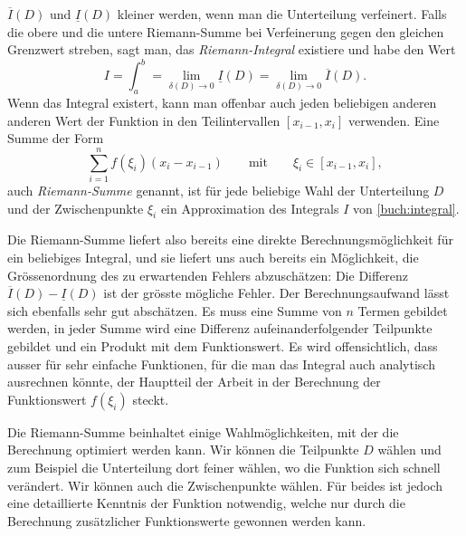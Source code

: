 $\overline{I}(D)$ und $\underline{I}(D)$ kleiner werden, wenn man die 
Unterteilung verfeinert.
Falls die obere und die untere Riemann-Summe bei Verfeinerung gegen
den gleichen Grenzwert streben, sagt man, das {\em Riemann-Integral}
%
existiere und habe den Wert
\[
I
=
\int_a^b
=
\lim_{\delta(D)\to 0} \underline{I}(D)
=
\lim_{\delta(D)\to 0} \overline{I}(D).
\]
Wenn das Integral existert, kann man offenbar auch jeden beliebigen
anderen anderen Wert der Funktion in den Teilintervallen $[x_{i-1},x_i]$
verwenden.
Eine Summe der Form
\[
\sum_{i=1}^n f(\xi_i) (x_{i}-x_{i-1})
\qquad\text{mit}\qquad \xi_i \in [x_{i-1},x_i],
\]
auch {\em Riemann-Summe} genannt,
ist für jede beliebige Wahl der Unterteilung $D$ und der Zwischenpunkte
$\xi_i$ ein Approximation des Integrals $I$ von \eqref{buch:integral}.

Die Riemann-Summe liefert also bereits eine direkte Berechnungsmöglichkeit
für ein beliebiges Integral, und sie liefert uns auch bereits ein Möglichkeit,
die Grössenordnung des zu erwartenden Fehlers abzuschätzen:
Die Differenz $\overline{I}(D)-\underline{I}(D)$ ist der grösste mögliche
Fehler.
Der Berechnungsaufwand lässt sich ebenfalls sehr gut abschätzen.
Es muss eine Summe von $n$ Termen gebildet werden, in jeder Summe
wird eine Differenz aufeinanderfolgender Teilpunkte gebildet und
ein Produkt mit dem Funktionswert.
Es wird offensichtlich, dass ausser für sehr einfache Funktionen, für die
man das Integral auch analytisch ausrechnen könnte, der Hauptteil der
Arbeit in der Berechnung der Funktionswert $f(\xi_i)$ steckt.

Die Riemann-Summe beinhaltet einige Wahlmöglichkeiten, mit der die
Berechnung optimiert werden kann.
Wir können die Teilpunkte $D$ wählen und zum Beispiel die Unterteilung
dort feiner wählen, wo die Funktion sich schnell verändert.
Wir können auch die Zwischenpunkte wählen.
Für beides ist jedoch eine detaillierte Kenntnis der Funktion notwendig,
welche nur durch die Berechnung zusätzlicher Funktionswerte gewonnen
werden kann.

